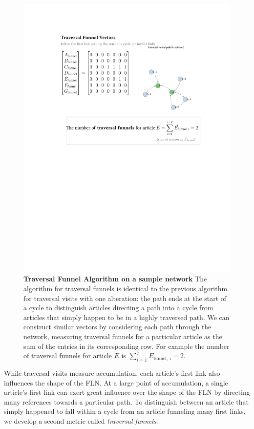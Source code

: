 \documentclass[pre,twocolumn,twoside,superscriptaddress,floatfix, aps, 10pt]{revtex4-1}
\begin{document}
\begin{figure}[tp!]
  \centering	
  \includegraphics[width=\columnwidth]{graphics/traversal_funnel_algo_figure.pdf}
  \caption{
    \textbf{Traversal Funnel Algorithm on a sample network}
  The algorithm for traversal funnels is identical to the previous algorithm for traversal visits with one alteration: the path ends at the start of a cycle to distinguish articles directing a path into a cycle from articles that simply happen to be in a highly traversed path. We can construct similar vectors by considering each path through the network, measuring traversal funnels for a particular article as the sum of the entries in its corresponding row. For example
  the number of traversal funnels for article $E$ is 
  $\sum_{i=1}^7 E_{\text{funnel, i}} = 2$.}
  \label{fig:Traversal Funnels}

\end{figure}

While traversal visits measure accumulation, each article's first link also 
influences the shape of the FLN. 
At a large point of accumulation, a single article's first link 
can exert great influence over the shape of the FLN by directing many
references towards a particular path. To distinguish between an article 
that simply happened to fall within a cycle from an article funneling 
many first links, we develop a second metric called {\it traversal funnels}.
\end{document}
